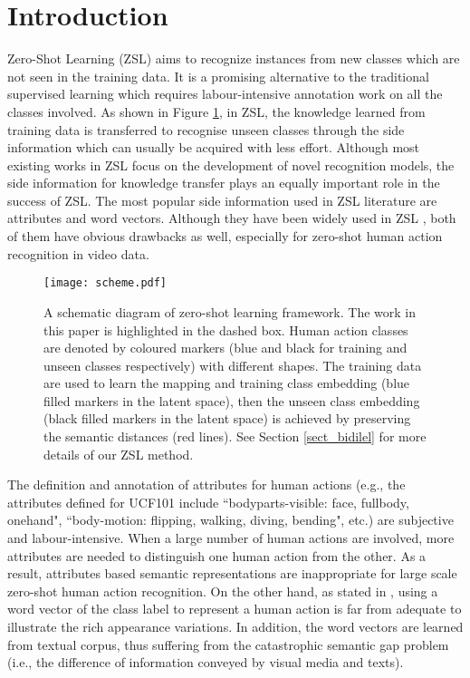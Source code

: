 \documentclass[runningheads,a4paper] {llncs}
\begin{document}
\section{Introduction}
Zero-Shot Learning (ZSL) aims to recognize instances from new classes which are not seen in the training data. It is a promising alternative to the traditional supervised learning which requires labour-intensive annotation work on all the classes involved. As shown in Figure \ref{fig_scheme}, in ZSL, the knowledge learned from training data is transferred to recognise unseen classes through the side information which can usually be acquired with less effort. Although most existing works in ZSL focus on the development of novel recognition models, the side information for knowledge transfer plays an equally important role in the success of ZSL. The most popular side information used in ZSL literature are attributes and word vectors. Although they have been widely used in ZSL \cite{lampert2009learning,liu2011recognizing,inoue2016adaptation,wang2016zero,xian2017zero}, both of them have obvious drawbacks as well, especially for zero-shot human action recognition in video data.

\begin{figure}
\texttt{[image: scheme.pdf]}
\caption{A schematic diagram of zero-shot learning framework. The work in this paper is highlighted in the dashed box. Human action classes are denoted by coloured markers (blue and black for training and unseen classes respectively) with different shapes. The training data are used to learn the mapping  and training class embedding (blue filled markers in the latent space), then the unseen class embedding (black filled markers in the latent space) is achieved by preserving the semantic distances (red lines). See Section \ref{sect_bidilel} for more details of our ZSL method.}
\label{fig_scheme}
\end{figure}

The definition and annotation of attributes for human actions (e.g., the attributes defined for UCF101 \cite{jiang2014thumos} include ``bodyparts-visible: face, fullbody, onehand", ``body-motion: flipping, walking, diving, bending", etc.) are subjective and labour-intensive. When a large number of human actions are involved, more attributes are needed to distinguish one human action from the other. As a result, attributes based semantic representations are inappropriate for large scale zero-shot human action recognition.
On the other hand, as stated in \cite{alexiou2016exploring}, using a word vector of the class label to represent a human action is far from adequate to illustrate the rich appearance variations. In addition, the word vectors are learned from textual corpus, thus suffering from the catastrophic semantic gap problem (i.e., the difference of information conveyed by visual media and texts).
\end{document}
